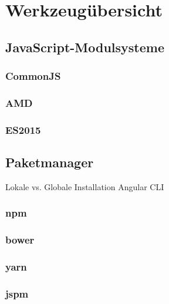 \section{Werkzeugübersicht}
\label{sec:tools-overview}

\subsection{JavaScript-Modulsysteme}
\label{sub:js-modulesystems}
\subsubsection{CommonJS}
\label{sub:commonjs}
\subsubsection{AMD}
\label{sub:amd}
\subsubsection{ES2015}
\label{sub:es2015}


\subsection{Paketmanager}
\label{sub:package-managers}

Lokale vs. Globale Installation
Angular CLI


\subsubsection{npm}
\label{sub:npm}
\subsubsection{bower}
\label{sub:bower}
\subsubsection{yarn}
\label{sub:yarn}
\subsubsection{jspm}
\label{sub:jspm}
